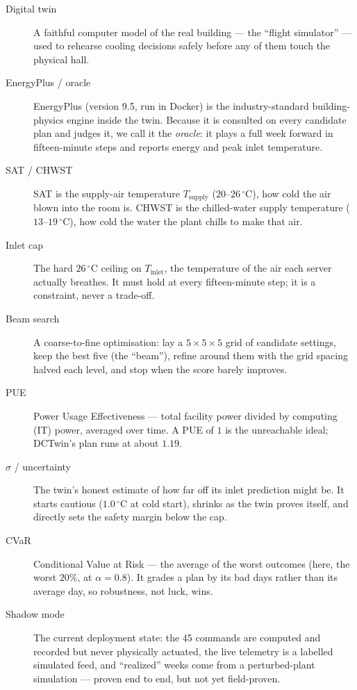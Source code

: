 \documentclass[11pt]{report}
\begin{document}
\begin{description}
  \item[Digital twin] A faithful computer model of the real building --- the ``flight simulator'' --- used to rehearse cooling decisions safely before any of them touch the physical hall.
  \item[EnergyPlus / oracle] EnergyPlus (version 9.5, run in Docker) is the industry-standard building-physics engine inside the twin. Because it is consulted on every candidate plan and judges it, we call it the \emph{oracle}: it plays a full week forward in fifteen-minute steps and reports energy and peak inlet temperature.
  \item[SAT / CHWST] SAT is the supply-air temperature $T_{\text{supply}}$ ($20$--$26\,^\circ$C), how cold the air blown into the room is. CHWST is the chilled-water supply temperature ($13$--$19\,^\circ$C), how cold the water the plant chills to make that air.
  \item[Inlet cap] The hard $26\,^\circ$C ceiling on $T_{\text{inlet}}$, the temperature of the air each server actually breathes. It must hold at every fifteen-minute step; it is a constraint, never a trade-off.
  \item[Beam search] A coarse-to-fine optimisation: lay a $5\times5\times5$ grid of candidate settings, keep the best five (the ``beam''), refine around them with the grid spacing halved each level, and stop when the score barely improves.
  \item[PUE] Power Usage Effectiveness --- total facility power divided by computing (IT) power, averaged over time. A PUE of $1$ is the unreachable ideal; DCTwin's plan runs at about $1.19$.
  \item[$\sigma$ / uncertainty] The twin's honest estimate of how far off its inlet prediction might be. It starts cautious ($1.0\,^\circ$C at cold start), shrinks as the twin proves itself, and directly sets the safety margin below the cap.
  \item[CVaR] Conditional Value at Risk --- the average of the worst outcomes (here, the worst $20\%$, at $\alpha = 0.8$). It grades a plan by its bad days rather than its average day, so robustness, not luck, wins.
  \item[Shadow mode] The current deployment state: the 45 commands are computed and recorded but never physically actuated, the live telemetry is a labelled simulated feed, and ``realized'' weeks come from a perturbed-plant simulation --- proven end to end, but not yet field-proven.
\end{description}
\end{document}
